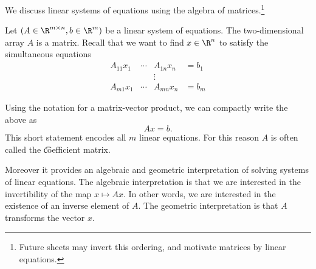 

We discuss linear systems of equations using the algebra of matrices.\footnote{Future sheets may invert this ordering, and motivate matrices by linear equations.}


Let $(A \in \R^{m \times n}, b \in \R^{m})$ be a linear system of equations.
The two-dimensional array $A$ is a matrix.
Recall that we want to find $x \in \R^{n}$ to satisfy the simultaneous equations
\[
  \begin{aligned}
  A_{11}x_1 & \cdots & A_{1n}x_n & = b_1 \\
  & & \vdots & \\
  A_{m1}x_1 & \cdots & A_{mn}x_n & = b_m
  \end{aligned}
\]

Using the notation for a matrix-vector product, we can compactly write the above as
\[
  Ax = b.
\]
This short statement encodes all $m$ linear equations.
For this reason $A$ is often called the \t{coefficient matrix}.

Moreover it provides an algebraic and geometric interpretation of solving systems of linear equations.
The algebraic interpretation is that we are interested in the invertibility of the map $x \mapsto Ax$.
In other words, we are interested in the existence of an inverse element of $A$.
The geometric interpretation is that $A$ transforms the vector $x$.

\blankpage
